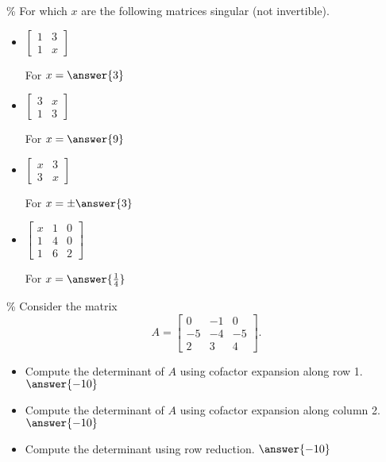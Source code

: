 \documentclass{ximera}
\begin{document}
\begin{exercise}\%
    For which $x$ are the following matrices singular (not invertible).
    \begin{itemize}
        \item
        $\begin{bmatrix}
            1 & 3 \\
            1 & x
        \end{bmatrix}$
        
        For $x = \answer{3}$
        \item
        $\begin{bmatrix}
            3 & x \\
            1 & 3
        \end{bmatrix}$
        
        For $x = \answer{9}$
        \item
        $\begin{bmatrix}
            x & 3 \\
            3 & x
        \end{bmatrix}$
        
        For $x = \pm\answer{3}$
        \item
        $\begin{bmatrix}
            x & 1 & 0 \\
            1 & 4 & 0 \\
            1 & 6 & 2
        \end{bmatrix}$
        
        For $x = \answer{\frac{1}{4}}$
    \end{itemize}
\end{exercise}

\begin{exercise}\%
    Consider the matrix
    \begin{equation*}
        A = \begin{bmatrix}
        0 & -1 & 0 \\ -5 & -4 & -5 \\ 2 & 3 & 4
        \end{bmatrix}.
    \end{equation*}
    \begin{itemize}
        \item Compute the determinant of $A$ using cofactor expansion along row 1. $\answer{-10}$
        \item Compute the determinant of $A$ using cofactor expansion along column 2. $\answer{-10}$
        \item Compute the determinant using row reduction. $\answer{-10}$
    \end{itemize}
\end{exercise}
\end{document}
